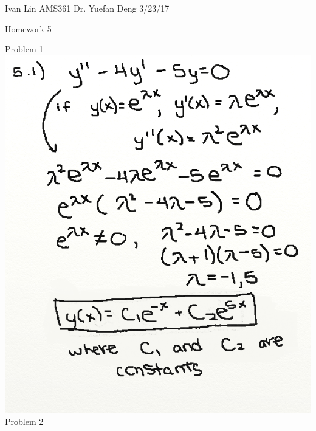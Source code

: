 \documentclass{article}
\begin{document}
Ivan Lin\newline{}
AMS361\newline{}
Dr. Yuefan Deng\newline{}
3/23/17\newline{}

\begin{center}
  Homework 5
\end{center}

\underline{Problem 1}\newline{}
\includegraphics[width=\textwidth,height=\textheight,keepaspectratio]{ams361.png}\clearpage{}
\underline{Problem 2}\newline{}
\end{document}
